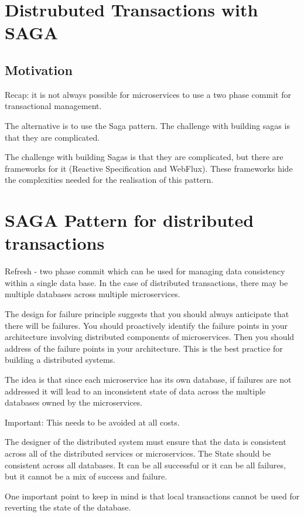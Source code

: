 
\section{Distrubuted Transactions with SAGA}

\subsection{Motivation}

\begin{note}
    Recap: it is not always possible for microservices to use a two phase commit for transactional management.
\end{note}
The alternative is to use the Saga pattern.
The challenge with building sagas is that they are complicated.

The challenge with building Sagas is that they are complicated, but there are frameworks for it (Reactive Specification and WebFlux).
These frameworks hide the complexities needed for the realisation of this pattern.


\section{SAGA Pattern for distributed transactions}
Refresh - two phase commit which can be used for managing data consistency within a single data base.
In the case of distributed transactions, there may be multiple databases across multiple microservices.

The design for failure principle suggests that you should always anticipate that there will be failures.
You should proactively identify the failure points in your architecture involving distributed components of microservices.
Then you should address of the failure points in your architecture.
This is the best practice for building a distributed systems.

The idea is that since each microservice has its own database, if failures are not addressed it will lead to an inconsistent state of data across the multiple databases owned by the microservices.
\begin{note}
    Important: This needs to be avoided at all costs.
\end{note}

The designer of the distributed system must ensure that the data is consistent across all of the distributed services or microservices.
The State should be consistent across all databases.
It can be all successful or it can be all failures, but it cannot be a mix of success and failure.
\begin{note}
    One important point to keep in mind is that local transactions cannot be used for reverting the state of the database.
\end{note}

